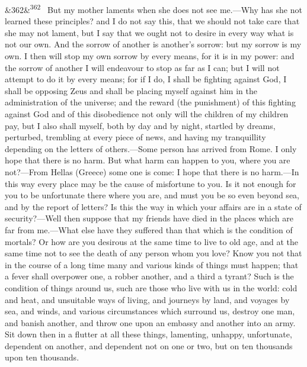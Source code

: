 \documentclass[12pt]{article}
\newcommand{\para}[1][]{\par\noindent\ifx&#1&\else\textsuperscript{\footnotesize #1}~\fi}
\begin{document}
\para[362] But my mother laments when she does not see me.—Why has she not learned these principles? and I do not say this, that we should not take care that she may not lament, but I say that we ought not to desire in every way what is not our own. And the sorrow of another is another's sorrow: but my sorrow is my own. I then will stop my own sorrow by every means, for it is in my power: and the sorrow of another I will endeavour to stop as far as I can; but I will not attempt to do it by every means; for if I do, I shall be fighting against God, I shall be opposing Zeus and shall be placing myself against him in the administration of the universe; and the reward (the punishment) of this fighting against God and of this disobedience not only will the children of my children pay, but I also shall myself, both by day and by night, startled by dreams, perturbed, trembling at every piece of news, and having my tranquillity depending on the letters of others.—Some person has arrived from Rome. I only hope that there is no harm. But what harm can happen to you, where you are not?—From Hellas (Greece) some one is come: I hope that there is no harm.—In this way every place may be the cause of misfortune to you. Is it not enough for you to be unfortunate there where you are, and must you be so even beyond sea, and by the report of letters? Is this the way in which your affairs are in a state of security?—Well then suppose that my friends have died in the places which are far from me.—What else have they suffered than that which is the condition of mortals? Or how are you desirous at the same time to live to old age, and at the same time not to see the death of any person whom you love? Know you not that in the course of a long time many and various kinds of things must happen; that a fever shall overpower one, a robber another, and a third a tyrant? Such is the condition of things around us, such are those who live with us in the world: cold and heat, and unsuitable ways of living, and journeys by land, and voyages by sea, and winds, and various circumstances which surround us, destroy one man, and banish another, and throw one upon an embassy and another into an army. Sit down then in a flutter at all these things, lamenting, unhappy, unfortunate, dependent on another, and dependent not on one or two, but on ten thousands upon ten thousands.
\end{document}
